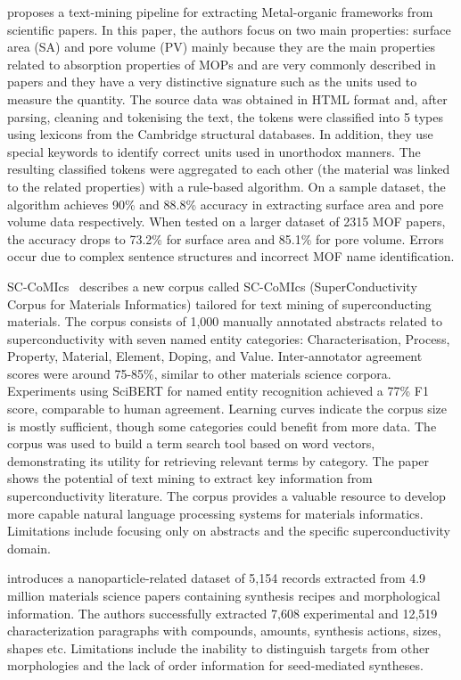 \cite{park2018text} proposes a text-mining pipeline for extracting Metal-organic frameworks from scientific papers. In this paper, the authors focus on two main properties: surface area (SA) and pore volume (PV) mainly because they are the main properties related to absorption properties of MOPs and are very commonly described in papers and they have a very distinctive signature such as the units used to measure the quantity. 
The source data was obtained in HTML format and, after parsing, cleaning and tokenising the text, the tokens were classified into 5 types using lexicons from the Cambridge structural databases. In addition, they use special keywords to identify correct units used in unorthodox manners. The resulting classified tokens were aggregated to each other (the material was linked to the related properties) with a rule-based algorithm.
On a sample dataset, the algorithm achieves 90\% and 88.8\% accuracy in extracting surface area and pore volume data respectively.
When tested on a larger dataset of 2315 MOF papers, the accuracy drops to 73.2\% for surface area and 85.1\% for pore volume. Errors occur due to complex sentence structures and incorrect MOF name identification.

SC-CoMIcs~\cite{yamaguchi-etal-2020-sc}  describes a new corpus called SC-CoMIcs (SuperConductivity Corpus for Materials Informatics) tailored for text mining of superconducting materials.
The corpus consists of 1,000 manually annotated abstracts related to superconductivity with seven named entity categories: Characterisation, Process, Property, Material, Element, Doping, and Value. Inter-annotator agreement scores were around 75-85\%, similar to other materials science corpora.
Experiments using SciBERT for named entity recognition achieved a 77\% F1 score, comparable to human agreement.
Learning curves indicate the corpus size is mostly sufficient, though some categories could benefit from more data. The corpus was used to build a term search tool based on word vectors, demonstrating its utility for retrieving relevant terms by category. The paper shows the potential of text mining to extract key information from superconductivity literature. The corpus provides a valuable resource to develop more capable natural language processing systems for materials informatics. Limitations include focusing only on abstracts and the specific superconductivity domain. 


\cite{cruse2022text} introduces a nanoparticle-related dataset of 5,154 records extracted from 4.9 million materials science papers containing synthesis recipes and morphological information.
The authors successfully extracted 7,608 experimental and 12,519 characterization paragraphs with compounds, amounts, synthesis actions, sizes, shapes etc.
Limitations include the inability to distinguish targets from other morphologies and the lack of order information for seed-mediated syntheses.


